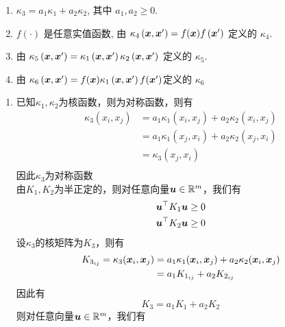\documentclass[answers]{exam}  %
\begin{document}
\begin{questions}
\begin{enumerate}
    \item $\kappa_{3}=a_{1} \kappa_{1}+a_{2} \kappa_{2}$, 其中 $a_{1}, a_{2} \geq 0$.
    \item $f(\cdot)$ 是任意实值函数, 由 $\kappa_{4}\left({\boldsymbol{x}}, {\boldsymbol{x}}^{\prime}\right)=f({\boldsymbol{x}}) f\left({\boldsymbol{x}}^{\prime}\right)$ 定义的 $\kappa_{4}$.
    \item 由 $\kappa_{5}\left({\boldsymbol{x}}, {\boldsymbol{x}}^{\prime}\right)=\kappa_{1}\left({\boldsymbol{x}}, {\boldsymbol{x}}^{\prime}\right) \kappa_{2}\left({\boldsymbol{x}}, {\boldsymbol{x}}^{\prime}\right)$ 定义的 $\kappa_{5}$.
    \item 由 $\kappa_{6}\left({\boldsymbol{x}}, {\boldsymbol{x}}^{\prime}\right)=f({\boldsymbol{x}}) \kappa_{1}\left({\boldsymbol{x}}, {\boldsymbol{x}}^{\prime}\right)f({\boldsymbol{x}}')$定义的 $\kappa_{6}$
\end{enumerate}
	\begin{solution}
	    \begin{enumerate}
            \item 已知$\kappa_1,\kappa_2$为核函数，则为对称函数，则有
            \[
                \begin{aligned}
                    \kappa_3(x_i,x_j)
                    &=a_1\kappa_1(x_i,x_j)+a_2\kappa_2(x_i,x_j)\\
                    &=a_1\kappa_1(x_j,x_i)+a_2\kappa_2(x_j,x_i)\\
                    &=\kappa_3(x_j,x_i)\\
                \end{aligned}    
            \] 
            因此$\kappa_3$为对称函数\\
            由$K_1,K_2$为半正定的，则对任意向量$\boldsymbol{u}\in\mathbb R^m$，我们有
            \[ 
                \begin{aligned}
                    &\boldsymbol{u}^\top K_1\boldsymbol{u}\ge0\\
                    &\boldsymbol{u}^\top K_2\boldsymbol{u}\ge0
                \end{aligned}    
            \]
            设$\kappa_3$的核矩阵为$K_3$，则有
            \[
                \begin{aligned}
                    K_{3_{ij}}=\kappa_3({\boldsymbol{x}}_i,{\boldsymbol{x}}_j)
                    &=a_1\kappa_1({\boldsymbol{x}}_i,{\boldsymbol{x}}_j)+a_2\kappa_2({\boldsymbol{x}}_i,{\boldsymbol{x}}_j)\\
                    &=a_1K_{1_{ij}}+a_2K_{2_{ij}}
                \end{aligned}
            \]
            因此有
            \[K_3=a_1K_1+a_2K_2  \]
            则对任意向量$\boldsymbol{u}\in\mathbb R^m$，我们有
            \[
                \begin{aligned}

\end{aligned}\]
\end{enumerate}
\end{solution}
\end{questions}
\end{document}

